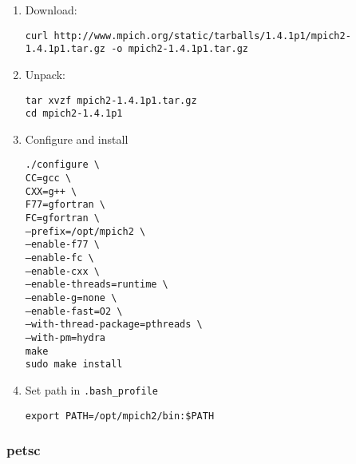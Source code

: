 \documentclass[a4paper,11pt]{article}
\begin{document}
\begin{enumerate}
\item Download:

\indent \texttt{\scriptsize curl http://www.mpich.org/static/tarballs/1.4.1p1/mpich2-1.4.1p1.tar.gz -o mpich2-1.4.1p1.tar.gz}

\item Unpack:

\indent \texttt{tar xvzf mpich2-1.4.1p1.tar.gz}\\
\indent \texttt{cd mpich2-1.4.1p1}

\item Configure and install

\indent \texttt{./configure \textbackslash}\\
\indent \texttt{CC=gcc \textbackslash}\\
\indent \texttt{CXX=g++ \textbackslash}\\
\indent \texttt{F77=gfortran \textbackslash}\\
\indent \texttt{FC=gfortran \textbackslash}\\
\indent \texttt{--prefix=/opt/mpich2 \textbackslash}\\
\indent \texttt{--enable-f77 \textbackslash}\\
\indent \texttt{--enable-fc \textbackslash}\\
\indent \texttt{--enable-cxx \textbackslash}\\
\indent \texttt{--enable-threads=runtime \textbackslash}\\
\indent \texttt{--enable-g=none \textbackslash}\\
\indent \texttt{--enable-fast=O2 \textbackslash}\\
\indent \texttt{--with-thread-package=pthreads \textbackslash}\\
\indent \texttt{--with-pm=hydra}\\

\indent \texttt{make}\\
\indent \texttt{sudo make install}\\

\item Set path in \texttt{.bash\_profile}

\indent \texttt{export PATH=/opt/mpich2/bin:\$PATH}

\end{enumerate}

\subsubsection{petsc}
\end{document}

